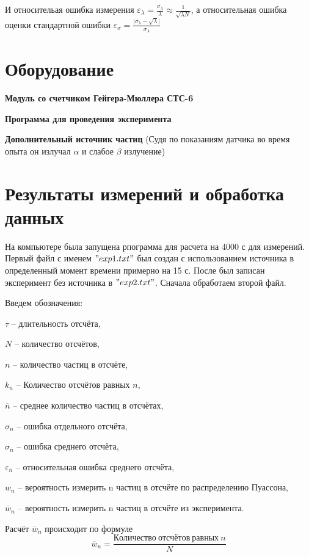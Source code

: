\documentclass[12pt,a4paper]{article}
\begin{document}
И относительая ошибка измерения $\varepsilon_{\lambda}=\frac{\sigma_{\lambda}}{\lambda} \approx \frac{1}{\sqrt{\lambda N}}$, а относительная ошибка оценки стандартной ошибки $\varepsilon_{\sigma}=\frac{\lvert \sigma _{\lambda}-\sqrt{\lambda} \rvert}{\sigma _{\lambda}}$

\section{Оборудование}

{\bfseries Модуль со счетчиком Гейгера-Мюллера СТС-6}

{\bfseries Программа для проведения эксперимента}

{\bfseries Дополнительный источник частиц} (Судя по показаниям датчика во время опыта он излучал $\alpha$ и слабое $\beta$ излучение)

\section{ Результаты измерений и обработка данных}
На компьютере была запущена рпограмма для расчета на 4000 с для измерений. Первый файл с именем $"exp1.txt"$ был создан с использованием источника в определенный момент времени примерно на 15 с. После был записан эксперимент без источника в $"exp2.txt"$. Сначала обработаем второй файл.

Введем обозначения:

$\tau$ -- длительность отсчёта, 

$N$ -- количество отсчётов,

$n$ -- количество частиц в отсчёте, 

$k_n$ -- Количество отсчётов равных $n$,

$\overline{n}$  -- среднее количество частиц в отсчётах, 

$\sigma_{n}$ -- ошибка отдельного отсчёта, 

$\sigma_{\overline{n}}$ -- ошибка среднего отсчёта, 

$\varepsilon_{\overline{n}}$ -- относительная ошибка среднего отсчёта, 

$w_n$ -- вероятность измерить n частиц в отсчёте по распределению Пуассона, 

$\overline{w}_n$ -- вероятность измерить n частиц в отсчёте из эксперимента.

Расчёт $\overline{w}_n$ происходит по формуле
\begin{equation}
    \overline{w}_n=\frac{Количество~отсчётов~равных~n}{N}
\end{equation}
\end{document}
